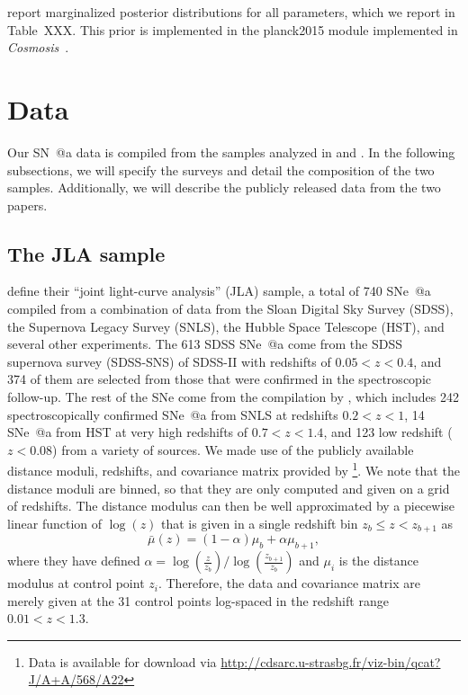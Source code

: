 \documentclass[12pt,a4paper]{article}
\makeatletter
\newcommand\Cosmosis{{\it Cosmosis}\ }
\newcommand*{\rom}[1]{\expandafter\@slowromancap\romannumeral #1@}
\newcommand{\sne}{\mbox{SNe}}
\newcommand{\sna}{\mbox{SN \rom{1}a}}
\newcommand{\snea}{\mbox{SNe \rom{1}a}}
\makeatother
\begin{document}
\citet{planck2013} report marginalized
posterior distributions for all parameters,
which we report in Table~XXX. This prior is implemented
in the planck2015 module implemented in \Cosmosis \citep{cosmosis}.

\section{Data}
\label{sec:data}
Our {\sna} data is compiled from the samples analyzed in 
\citet{betoule2014} and \citet{rest2014}. In the following subsections, 
we will specify the surveys and detail the composition of the two samples. 
Additionally, we will describe the publicly released data from the two papers.

\subsection{The JLA sample}
\label{sec:betoule}
\citet{betoule2014} define their ``joint light-curve analysis'' (JLA) 
sample, a total of 740 \snea{} compiled from a combination of 
data from the Sloan Digital Sky 
Survey (SDSS), the Supernova Legacy Survey (SNLS), the Hubble Space 
Telescope (HST), and several other experiments. The 613 SDSS \snea{} 
come from the SDSS supernova survey (SDSS-SNS) of SDSS-II \citep{sako2014} 
with redshifts of $0.05 < z < 0.4$, and 374 of them are selected from those 
that were confirmed in the spectroscopic follow-up. The rest of the 
\sne{} come from the compilation by \citet{conley2011}, which includes 
242 spectroscopically confirmed \snea{} from SNLS at redshifts $0.2 < z < 1$, 
14 \snea{} from HST at very high redshifts of $0.7 < z < 1.4$, and 123 
low redshift ($z < 0.08$) from a variety of sources. We made use of the 
publicly available distance moduli, redshifts, and covariance 
matrix provided by \citet{betoule2014}\footnote{Data is available 
for download via 
\url{http://cdsarc.u-strasbg.fr/viz-bin/qcat?J/A+A/568/A22}}. 
We note that the distance moduli are binned, so that they are only computed and 
given on a grid of redshifts. The distance modulus can then be well 
approximated by a piecewise linear function of $\log(z)$ that is given 
in a single redshift bin $z_b \le z < z_{b+1}$ as 
\citep[see][Appendix E.1]{betoule2014}
\begin{equation}
\label{eq:binnedMu}
\bar{\mu}(z) = (1 - \alpha) \mu_b + \alpha \mu_{b+1},
\end{equation}
where they have defined 
$\alpha = \log\left(\frac{z}{z_b}\right)/\log\left(\frac{z_{b+1}}{z_b}\right)$ 
and $\mu_i$ is the distance modulus at control point $z_i$. 
Therefore, the data and covariance matrix are merely given at the 
31 control points log-spaced in the redshift range $0.01 < z < 1.3$.
\end{document}
